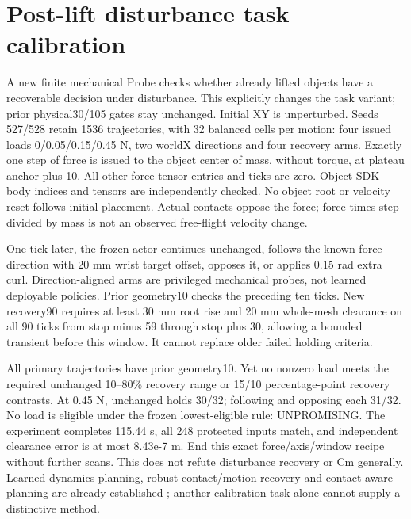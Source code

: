 \documentclass[10 pt]{article}
\begin{document}
\section{Post-lift disturbance task calibration}
A new finite mechanical Probe checks whether already lifted objects have a
recoverable decision under disturbance. This explicitly changes the task
variant; prior physical30/105 gates stay unchanged. Initial XY is unperturbed.
Seeds 527/528 retain 1536 trajectories, with 32 balanced cells per motion: four issued
loads 0/0.05/0.15/0.45 N, two worldX directions and four recovery arms. Exactly one
step of force is issued to the object center of mass, without torque, at plateau
anchor plus 10. All other force tensor entries and ticks are zero. Object SDK
body indices and tensors are independently checked. No object root or velocity
reset follows initial placement. Actual contacts oppose the force; force times
step divided by mass is not an observed free-flight velocity change.

One tick later, the frozen actor continues unchanged, follows the known force
direction with 20 mm wrist target offset, opposes it, or applies 0.15 rad extra curl.
Direction-aligned arms are privileged mechanical probes, not learned deployable
policies. Prior geometry10 checks the preceding ten ticks. New recovery90 requires
at least 30 mm root rise and 20 mm whole-mesh clearance on all 90 ticks from stop minus 59
through stop plus 30, allowing a bounded transient before this window. It cannot
replace older failed holding criteria.

\begin{table}[h]
\centering

\caption{Primary-motion mechanical calibration. Counts are actual executed trajectories; no Cm or policy training occurs. All other motions and both seeds are also reported in the retained results.}
\end{table}

All primary trajectories have prior geometry10. Yet no nonzero load meets the
required unchanged 10--80\% recovery range or 15/10 percentage-point recovery contrasts.
At 0.45 N, unchanged holds 30/32; following and opposing each 31/32. No load is
eligible under the frozen lowest-eligible rule: UNPROMISING. The experiment
completes 115.44 s, all 248 protected inputs match, and independent clearance error
is at most 8.43e-7 m. End this exact force/axis/window recipe without further scans.
This does not refute disturbance recovery or Cm generally. Learned dynamics
planning, robust contact/motion recovery and contact-aware planning are already
established \cite{nagabandi2020,jiang2025,suh2026}; another calibration task alone
cannot supply a distinctive method.
\end{document}
